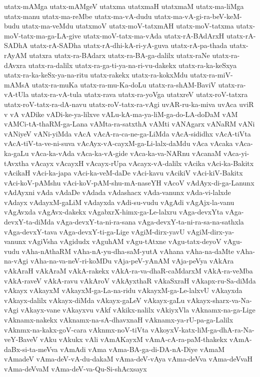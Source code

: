 {utatx-mAMga
utatx-mAMgeV
utatxma
utatxmaH
utatxmaM
utatx-ma-liMga
utatx-manu
utatx-ma-reMbe
utatx-ma-vA-dudu
utatx-ma-vA-gi-ra-beV-keM-budu
utatx-ma-veMdu
utatxmoV
utatx-moV-tatxmAH
utatx-moV-tatxma
utatx-moV-tatx-ma-ga-LA-give
utatx-moV-tatx-ma-vAda
utatx-rA-BAdArxH
utatx-rA-SADhA
utatx-rA-SADha
utatx-rA-dhi-kA-ri-yA-guva
utatx-rA-pa-thada
utatx-rAyAM
utatxra
utatx-ra-BAdarx
utatx-ra-BA-ga-dalilx
utatx-raNe
utatx-ra-dAvxra
utatx-ra-dalilx
utatx-ra-ga-ti-ya-na-ri-vu-dakekx
utatx-ra-ka-keSxya
utatx-ra-ka-keSx-ya-na-ritu
utatx-rakekx
utatx-ra-kokxMdu
utatx-ra-miV-mAMsA
utatx-ra-muKa
utatx-ra-mu-Ka-doLu
utatx-ra-shAM-BaviV
utatx-ra-vA-tUla
utatx-ra-vA-tula
utatx-rava
utatx-ra-yoVga
utatxreV
utatx-roV-tatxra
utatx-roV-tatx-ra-dA-navu
utatx-roV-tatx-ra-vAgi
uvAR-ru-ka-miva
uvAca
uviR
v
vA
vADike
vADi-ke-ya-lilxve
vALu-kA-ma-ya-liM-ga-do-LA-doDaM
vAM
vAMCi-tA-thaRM-ga-Lana
vAMta-ra-satxthA
vAMti
vANAgarx
vANaRM
vANi
vANiyeV
vANi-yiMda
vAcA
vAcA-ra-ca-ne-ga-LiMda
vAcA-sididhx
vAcA-tiVta
vAcA-tiV-ta-ve-ni-suva
vAcAyx-vA-cayxM-ga-Li-lalx-daMdu
vAca
vAcaka
vAca-ka-gaLu
vAca-ka-vAda
vAca-ka-vA-gide
vAca-ka-va-NARnu
vAcanaM
vAca-yi-tAvxtha
vAcayx
vAcayxH
vAcayx-rUpa
vAcayx-vA-dalilx
vAcika
vAci-ka-Bakitx
vAcikaH
vAci-ka-japa
vAci-ka-veM-daDe
vAci-kavu
vAcikiV
vAci-kiV-Bakitx
vAci-koV-pAMshu
vAci-koV-pAM-shu-mA-naseYH
vAcoV
vAdAyx-di-ga-Lanunx
vAdAyxni
vAda
vAdaDe
vAdada
vAdashacx
vAda-vanunx
vAda-vi-lalxde
vAdayx
vAdayxM-gaLiM
vAdayxda
vAdi-su-vudu
vAgAdi
vAgAjx-la-vanu
vAgAvxda
vAgAvx-dakekx
vAgabxrX-himx-ga-Le-lalxru
vAga-devxYta
vAga-devxY-ta-diMda
vAga-devxY-ta-ni-ra-sana
vAga-devxY-ta-ni-ra-sa-na-sathxla
vAga-devxY-tava
vAga-devxY-ti-ga-Lige
vAgiM-dirx-yavU
vAgiM-dirx-ya-vanunx
vAgiVsha
vAgidudx
vAguhAM
vAgu-tAtxne
vAgu-tatx-deyoV
vAgu-vudu
vAha-nAthaRM
vAha-nA-yu-dha-saM-yutA
vAhana
vAha-na-daMte
vAha-na-vAgi
vAha-na-va-neV-ri-koMDu
vAja-peV-yAnAM
vAja-peVya
vAkAra
vAkAraH
vAkAraM
vAkA-rakekx
vAkA-ra-va-dhaR-caMdarxM
vAkA-ra-veMba
vAkA-raveV
vAkA-ravu
vAkAroV
vAkAyxthaR
vAkaSxraH
vAkapx-ru-Sa-diMda
vAkayx
vAkayxM
vAkayxM-ga-La-na-ridu
vAkayxM-ga-Le-lalxvU
vAkayxda
vAkayx-dalilx
vAkayx-diMda
vAkayx-gaLeV
vAkayx-gaLu
vAkayx-sharx-va-Na-vAgi
vAkayx-vane
vAkayxvu
vAkf
vAkikx-nalilx
vAkiyxVla
vAknamx-na-ga-Lige
vAknamx-nakekx
vAknamx-na-sA-dhavxnaH
vAknamx-ya-rU-pa-ga-Lalilx
vAknmx-na-kakx-goV-cara
vAknmx-noV-tiVta
vAkoyxV-katx-liM-ga-dhA-ra-Na-veY-BaveV
vAku
vAkukx
vAli
vAmAKayxM
vAmA-cA-ra-paM-thakekx
vAmA-daBx-si-ta-meVva
vAmAdi
vAma
vAma-BA-ga-di-DA-nA-Diye
vAmaM
vAmadeV
vAma-deV-vA-du-dakaM
vAma-deV-vAya
vAma-deVva
vAma-deVvaH
vAma-deVvaM
vAma-deV-va-Qu-Si-shAcxsayx
}
